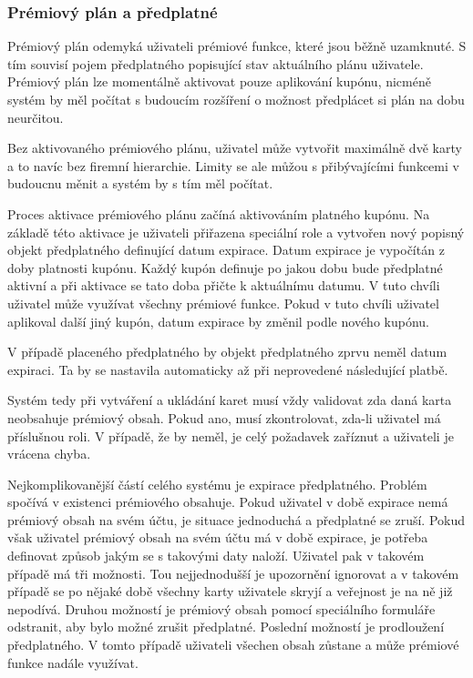 \begin{itemize}
\begin{itemize}
		\subsubsection{Prémiový plán a předplatné}

		Prémiový plán odemyká uživateli prémiové funkce, které jsou běžně uzamknuté.
		S tím souvisí pojem předplatného popisující stav aktuálního plánu uživatele.
		Prémiový plán lze momentálně aktivovat pouze aplikování kupónu, nicméně systém by měl počítat s budoucím rozšíření
		o možnost předplácet si plán na dobu neurčitou.

		Bez aktivovaného prémiového plánu, uživatel může vytvořit maximálně dvě karty a to navíc bez firemní hierarchie.
		Limity se ale můžou s přibývajícími funkcemi v budoucnu měnit a systém by s tím měl počítat.

		Proces aktivace prémiového plánu začíná aktivováním platného kupónu.
		Na základě této aktivace je uživateli přiřazena speciální role a vytvořen nový popisný objekt předplatného
		definující datum expirace.
		Datum expirace je vypočítán z doby platnosti kupónu.
		Každý kupón definuje po jakou dobu bude předplatné aktivní a při aktivace se tato doba přičte k aktuálnímu datumu.
		V tuto chvíli uživatel může využívat všechny prémiové funkce.
		Pokud v tuto chvíli uživatel aplikoval další jiný kupón, datum expirace by změnil podle nového kupónu.

		V případě placeného předplatného by objekt předplatného zprvu neměl datum expiraci.
		Ta by se nastavila automaticky až při neprovedené následující platbě.

		Systém tedy při vytváření a ukládání karet musí vždy validovat zda daná karta neobsahuje prémiový obsah.
		Pokud ano, musí zkontrolovat, zda-li uživatel má příslušnou roli.
		V případě, že by neměl, je celý požadavek zaříznut a uživateli je vrácena chyba.

		Nejkomplikovanější částí celého systému je expirace předplatného.
		Problém spočívá v existenci prémiového obsahuje.
		Pokud uživatel v době expirace nemá prémiový obsah na svém účtu, je situace jednoduchá a předplatné se zruší.
		Pokud však uživatel prémiový obsah na svém účtu má v době expirace, je potřeba definovat způsob jakým se
		s takovými daty naloží.
		Uživatel pak v takovém případě má tři možnosti.
		Tou nejjednodušší je upozornění ignorovat a v takovém případě se po nějaké době všechny karty uživatele skryjí
		a veřejnost je na ně již nepodívá.
		Druhou možností je prémiový obsah pomocí speciálního formuláře odstranit, aby bylo možné zrušit předplatné.
		Poslední možností je prodloužení předplatného.
		V tomto případě uživateli všechen obsah zůstane a může prémiové funkce nadále využívat.


\end{itemize}
\end{itemize}
